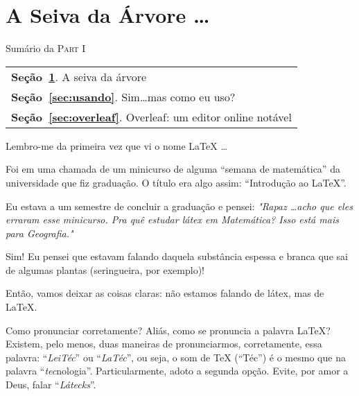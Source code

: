 \section{A Seiva da Árvore \ldots}\label{sec:seiva} %

\begin{margintable}\vspace{.8in}\footnotesize
  \caption{Sumário da \textsc{Part I}} 
  \medskip  
  \begin{tabularx}{\marginparwidth}{|X}
    \textbf{\sffamily \textcolor{azulUFRB}{Seção}~\ref{sec:seiva}}.    {\sffamily A seiva da árvore}                  \\
    \textbf{\sffamily \textcolor{azulUFRB}{Seção}~\ref{sec:usando}}.   {\sffamily Sim\ldots mas como eu uso?}         \\
    \textbf{\sffamily \textcolor{azulUFRB}{Seção}~\ref{sec:overleaf}}. {\sffamily Overleaf: um editor online notável} \\
  \end{tabularx}
\end{margintable}

Lembro-me da primeira vez que vi o nome \LaTeX{} \ldots

Foi em uma chamada de um minicurso de alguma ``semana de matemática'' da 
universidade que fiz graduação.
O título era algo assim: ``Introdução ao \LaTeX''.

Eu estava a um semestre de concluir a graduação e pensei: 
\textit{
  "Rapaz \ldots acho que eles erraram esse minicurso. 
  Pra quê estudar látex em Matemática? 
  Isso está mais para Geografia."
}

Sim! 
Eu pensei que estavam falando daquela substância espessa e branca que sai de 
algumas plantas (seringueira, por exemplo)!

Então, vamos deixar as coisas claras: não estamos falando de látex, mas de \LaTeX.

\begin{atencao}{Como pronunciar corretamente?}{\exclamacao}
  Aliás, como se pronuncia a palavra \LaTeX?\\
  Existem, pelo menos, duas maneiras de pronunciarmos, corretamente, essa palavra:
  ``\textit{LeiTéc}'' ou ``\textit{LaTéc}'', ou seja, o som de \TeX{} (``Téc'') é o 
  mesmo que na palavra ``\textit{tec}nologia''. 
  Particularmente, adoto a segunda opção.
  Evite, por amor a Deus, falar ``\textit{Látecks}''.
\end{atencao}

